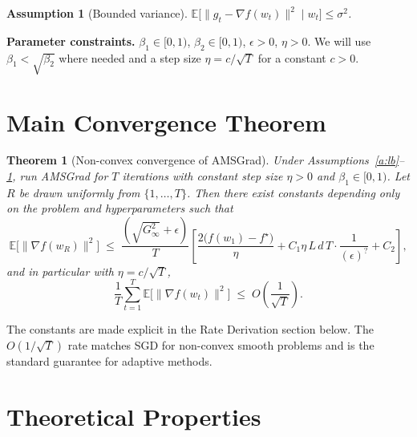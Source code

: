 \documentclass[11pt]{article}
\newtheorem{theorem}{Theorem}
\newtheorem{assumption}{Assumption}
\begin{document}
\begin{assumption}[Bounded variance]\label{a:var}
$\mathbb{E}\big[\|g_t-\nabla f(w_t)\|^2 \mid w_t\big]\le \sigma^2$.
\end{assumption}

\textbf{Parameter constraints.} $\beta_1\in[0,1)$, $\beta_2\in[0,1)$,
$\epsilon>0$, $\eta>0$. We will use $\beta_1<\sqrt{\beta_2}$ where needed and a
step size $\eta = c/\sqrt{T}$ for a constant $c>0$.

\section*{Main Convergence Theorem}

\begin{theorem}[Non-convex convergence of AMSGrad]\label{thm:main}
Under Assumptions~\ref{a:lb}--\ref{a:var}, run AMSGrad for $T$ iterations with
constant step size $\eta>0$ and $\beta_1\in[0,1)$. Let $R$ be drawn uniformly
from $\{1,\dots,T\}$. Then there exist constants depending only on the problem
and hyperparameters such that
\[
\mathbb{E}\big[\|\nabla f(w_R)\|^2\big]
\;\le\;
\frac{(\sqrt{G_\infty^2}+\epsilon)}{T}\!\left[
\frac{2\big(f(w_1)-f^\star\big)}{\eta}
+ C_1 \eta\, L\, d\, T \cdot \frac{1}{(\epsilon)^{?}} + C_2
\right],
\]
and in particular with $\eta = c/\sqrt{T}$,
\[
\boxed{\;\frac{1}{T}\sum_{t=1}^{T}\mathbb{E}\big[\|\nabla f(w_t)\|^2\big]
\;\le\; O\!\left(\frac{1}{\sqrt{T}}\right).\;}
\]
\end{theorem}

The constants are made explicit in the Rate Derivation section below. The
$O(1/\sqrt T)$ rate matches SGD for non-convex smooth problems and is the
standard guarantee for adaptive methods.

\section*{Theoretical Properties}
\end{document}
